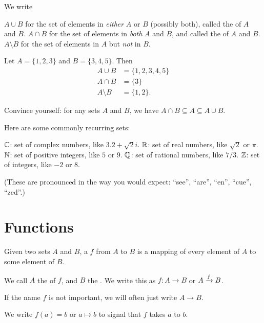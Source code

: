 \begin{definition}
	We write
	\begin{itemize}
		\ii $A \cup B$ for the set of elements in
		\emph{either} $A$ or $B$ (possibly both),
		called the  of $A$ and $B$.
		\ii $A \cap B$ for the set of elements in \emph{both} $A$ and $B$, and
		called the  of $A$ and $B$.
		\ii $A \setminus B$ for the set of elements in $A$ but \emph{not} in $B$.
	\end{itemize}
\end{definition}

\begin{example}
	Let $A = \{1,2,3\}$ and $B = \{3,4,5\}$. Then
	\begin{align*}
		A \cup B &= \{1,2,3,4,5\} \\
		A \cap B &= \{3\} \\
		A \setminus B &= \{1,2\}.
	\end{align*}
\end{example}

\begin{exercise}
	Convince yourself: for any sets $A$ and $B$,
	we have $A \cap B \subseteq A \subseteq A \cup B$.
\end{exercise}

Here are some commonly recurring sets:
\begin{itemize}
	\ii $\mathbb C$: set of complex numbers, like $3.2 + \sqrt 2 i$.
	\ii $\mathbb R$: set of real numbers, like $\sqrt 2$ or $\pi$.
	\ii $\mathbb N$: set of positive integers, like $5$ or $9$.
	\ii $\mathbb Q$: set of rational numbers, like $7/3$.
	\ii $\mathbb Z$: set of integers, like $-2$ or $8$.
\end{itemize}
(These are pronounced in the way you would expect:
``see'', ``are'', ``en'', ``cue'', ``zed''.)


\section{Functions}
Given two sets $A$ and $B$, a  $f$ from $A$ to $B$
is a mapping of every element of $A$ to some element of $B$.

We call $A$ the  of $f$, and $B$ the .
We write this as $f : A \to B$ or $A \xrightarrow{f} B$.
\begin{abuse}
	If the name $f$ is not important, we will often just write $A \to B$.
\end{abuse}
We write $f(a) = b$ or $a \mapsto b$ to signal that $f$ takes $a$ to $b$.

